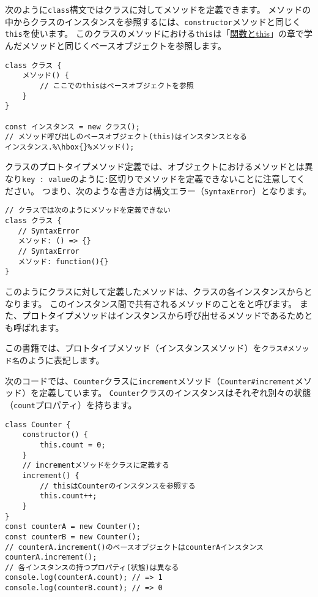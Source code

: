 次のように\texttt{class}構文ではクラスに対してメソッドを定義できます。
メソッドの中からクラスのインスタンスを参照するには、\texttt{constructor}メソッドと同じく\texttt{this}を使います。
このクラスのメソッドにおける\texttt{this}は「\hyperlink{function-this}{関数とthis}」の章で学んだメソッドと同じくベースオブジェクトを参照します。

\begin{lstlisting}[escapechar=\%]
class クラス {
    メソッド() {
        // ここでのthisはベースオブジェクトを参照
    }
}

const インスタンス = new クラス();
// メソッド呼び出しのベースオブジェクト(this)はインスタンスとなる
インスタンス.%\hbox{}%メソッド();
\end{lstlisting}

クラスのプロトタイプメソッド定義では、オブジェクトにおけるメソッドとは異なり\texttt{key : value}のように\texttt{:}区切りでメソッドを定義できないことに注意してください。
つまり、次のような書き方は構文エラー（\texttt{SyntaxError}）となります。

\begin{lstlisting}
// クラスでは次のようにメソッドを定義できない
class クラス {
   // SyntaxError
   メソッド: () => {}
   // SyntaxError
   メソッド: function(){}
}
\end{lstlisting}

このようにクラスに対して定義したメソッドは、クラスの各インスタンスから\textbf{}となります。
このインスタンス間で共有されるメソッドのことを\textbf{}と呼びます。
また、プロトタイプメソッドはインスタンスから呼び出せるメソッドであるため\textbf{}とも呼ばれます。

この書籍では、プロトタイプメソッド（インスタンスメソッド）を\texttt{クラス\#メソッド名}のように表記します。

次のコードでは、\texttt{Counter}クラスに\texttt{increment}メソッド（\texttt{Counter\#increment}メソッド）を定義しています。
\texttt{Counter}クラスのインスタンスはそれぞれ別々の状態（\texttt{count}プロパティ）を持ちます。

\begin{lstlisting}
class Counter {
    constructor() {
        this.count = 0;
    }
    // incrementメソッドをクラスに定義する
    increment() {
        // thisはCounterのインスタンスを参照する
        this.count++;
    }
}
const counterA = new Counter();
const counterB = new Counter();
// counterA.increment()のベースオブジェクトはcounterAインスタンス
counterA.increment();
// 各インスタンスの持つプロパティ(状態)は異なる
console.log(counterA.count); // => 1
console.log(counterB.count); // => 0
\end{lstlisting}

